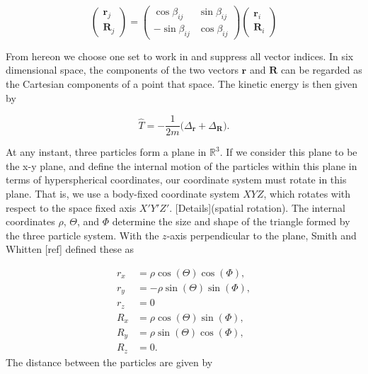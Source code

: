 \documentclass{article}
\begin{document}
\begin{equation}
	\begin{pmatrix}
		\mathbf{r}_j\\
		\mathbf{R}_j
	\end{pmatrix}
	=
	\begin{pmatrix}
	\cos\beta_{ij} & \sin\beta_{ij}\\
	-\sin\beta_{ij} & \cos\beta_{ij}
	\end{pmatrix}
	\begin{pmatrix}
	\mathbf{r}_i\\
	\mathbf{R}_i
	\end{pmatrix}
\end{equation}   

From hereon we choose one set to work in and suppress all vector indices. In six dimensional space, the components of the two vectors $\mathbf{r}$ and $\mathbf{R}$ can be regarded as the Cartesian components of a point that space. The kinetic energy is then given by

\begin{equation}
\hat{T} = -\frac{1}{2m}\Big(\Delta_{\mathbf{r}}+\Delta_{\mathbf{R}}\Big).
\end{equation} 

At any instant, three particles form a plane in $\mathbb{R}^3$. If we consider this plane to be the x-y plane, and define the internal motion of the particles within this plane in terms of  hyperspherical coordinates, our coordinate system must rotate in this plane. That is, we use a body-fixed coordinate system $XYZ$, which rotates with respect to the space fixed axis $X'Y'Z'$. [Details](spatial rotation). The internal coordinates $\rho$, $\Theta$, and $\Phi$ determine the size and shape of the triangle formed by the three particle system. With the $z$-axis perpendicular to the plane, Smith and Whitten [ref] defined these as   

\begin{subequations}
\begin{align*}
	r_x &= \rho \cos(\Theta)\cos(\Phi),\\
	r_y &= -\rho \sin(\Theta)\sin(\Phi),\\
	r_z &= 0\\
	R_x &= \rho \cos(\Theta)\sin(\Phi),\\
	R_y &= \rho \sin(\Theta)\cos(\Phi),\\
	R_z &= 0.
\end{align*}   
\end{subequations}
The distance between the particles are given by
\end{document}
